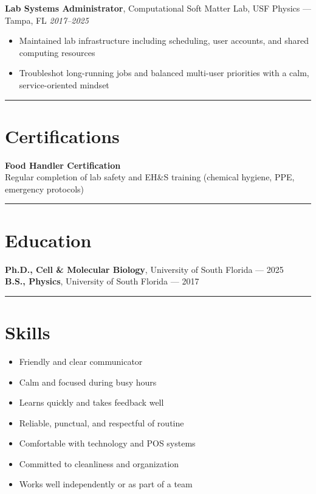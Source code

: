 \documentclass[11pt]{article}
\begin{document}
\textbf{Lab Systems Administrator}, Computational Soft Matter Lab, USF Physics --- Tampa, FL \hfill \textit{2017--2025} \\
\begin{itemize}[leftmargin=*, itemsep=1pt, topsep=3pt]
    \item Maintained lab infrastructure including scheduling, user accounts, and shared computing resources
    \item Troubleshot long-running jobs and balanced multi-user priorities with a calm, service-oriented mindset
\end{itemize}

\hrule
\vspace{0.5em}

\section*{Certifications}

\textbf{Food Handler Certification} \\[2pt]
Regular completion of lab safety and EH\&S training (chemical hygiene, PPE, emergency protocols)

\hrule
\vspace{0.5em}

\section*{Education}

\textbf{Ph.D., Cell \& Molecular Biology}, University of South Florida --- 2025 \\
\textbf{B.S., Physics}, University of South Florida --- 2017

\hrule
\vspace{0.5em}

\section*{Skills}
\begin{itemize}[leftmargin=*, itemsep=1pt, topsep=3pt]
    \item Friendly and clear communicator
    \item Calm and focused during busy hours
    \item Learns quickly and takes feedback well
    \item Reliable, punctual, and respectful of routine
    \item Comfortable with technology and POS systems
    \item Committed to cleanliness and organization
    \item Works well independently or as part of a team
\end{itemize}
\end{document}
